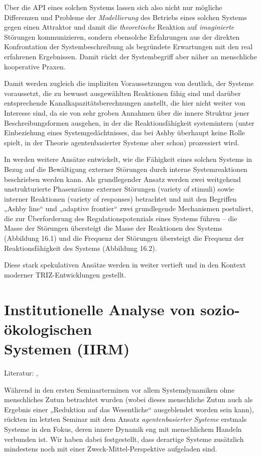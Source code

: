 \documentclass[11pt,a4paper]{article}
\begin{document}
Über die API eines solchen Systems lassen sich also nicht nur mögliche
Differenzen und Probleme der \emph{Modellierung} des Betriebs eines solchen
Systems gegen einen Attraktor und damit die \emph{theoretische} Reaktion auf
\emph{imaginierte} Störungen kommunizieren, sondern ebensolche Erfahrungen aus
der direkten Konfrontation der Systembeschreibung als begründete Erwartungen
mit den real erfahrenen Ergebnissen. Damit rückt der Systembegriff aber näher
an menschliche kooperative Praxen.

Damit werden zugleich die impliziten Voraussetzungen von \cite{Ashby1958}
deutlich, der Systeme voraussetzt, die zu bewusst ausgewählten Reaktionen
fähig sind und darüber entsprechende Kanalkapazitätsberechnungen anstellt, die
hier nicht weiter von Interesse sind, da sie von sehr groben Annahmen über die
innere Struktur jener Beschreibungsformen ausgehen, in der die
Reaktionsfähigkeit systemintern (unter Einbeziehung eines Systemgedächtnisses,
das bei Ashby überhaupt keine Rolle spielt, in der Theorie agentenbasierter
Systeme aber schon) prozessiert wird.

In \cite{Boisot2011} werden weitere Ansätze entwickelt, wie die Fähigkeit
eines solchen Systems in Bezug auf die Bewältigung externer Störungen durch
interne Systemreaktionen beschrieben werden kann. Als grundlegender Ansatz
werden zwei weitgehend unstrukturierte Phasenräume externer Störungen (variety
of stimuli) sowie interner Reaktionen (variety of responses) betrachtet und
mit den Begriffen „Ashby line“ und „adaptive frontier“ zwei grundlegende
Mechanismen postuliert, die zur Überforderung des Regulationspotenzials eines
Systems führen -- die Masse der Störungen übersteigt die Masse der Reaktionen
des Systems (Abbildung 16.1) und die Frequenz der Störungen übersteigt die
Frequenz der Reaktionsfähigkeit des Systems (Abbildung 16.2).

Diese stark spekulativen Ansätze werden in \cite{Mann2019} weiter vertieft und in
den Kontext moderner TRIZ-Entwicklungen gestellt.

\section{Institutionelle Analyse von sozio-ökologischen\\ Systemen
  (IIRM)}

Literatur: \cite{Ostrom2007}, \cite{Anderies2004} 

Während in den ersten Seminarterminen vor allem Systemdynamiken ohne
menschliches Zutun betrachtet wurden (wobei dieses menschliche Zutun auch als
Ergebnis einer „Reduktion auf das Wesentliche“ ausgeblendet worden sein kann),
rückten im letzten Seminar mit dem Ansatz \emph{agentenbasierter Systeme}
erstmals Systeme in den Fokus, deren innere Dynamik eng mit menschlichem
Handeln verbunden ist. Wir haben dabei festgestellt, dass derartige Systeme
zusätzlich mindestens noch mit einer Zweck-Mittel-Perspektive aufgeladen sind.
\end{document}
